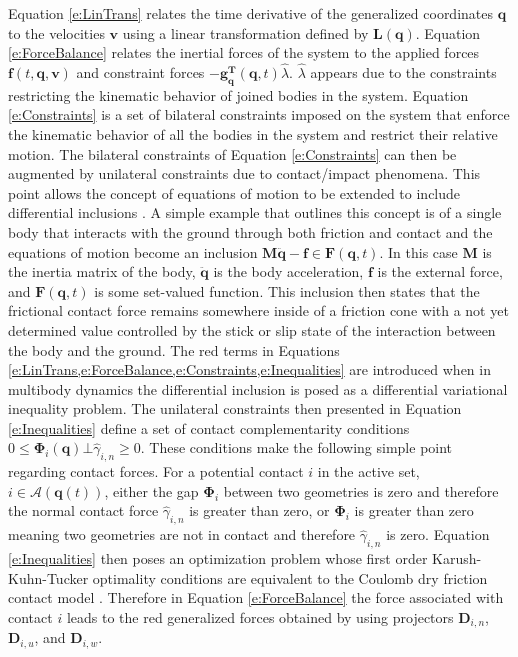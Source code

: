 \documentclass[12pt,onecolumn]{report}
\begin{document}
Equation \eqref{e:LinTrans} relates the time derivative of the generalized coordinates $\boldsymbol{q}$ to the velocities $\boldsymbol{v}$ using a linear transformation defined by $\boldsymbol{L}\left(\boldsymbol{q}\right)$. Equation \eqref{e:ForceBalance} relates the inertial forces of the system to the applied forces $\boldsymbol{f}\left(t,\boldsymbol{q},\boldsymbol{v}\right)$ and constraint forces $- \boldsymbol{g^T_q} \left(\boldsymbol{q},t\right)\hat{\lambda}$.  $\hat{\lambda}$ appears due to the constraints restricting the kinematic behavior of joined bodies in the system. Equation \eqref{e:Constraints} is a set of bilateral constraints imposed on the system that enforce the kinematic behavior of all the bodies in the system and restrict their relative motion. The bilateral constraints of Equation \eqref{e:Constraints} can then be augmented by unilateral constraints due to contact/impact phenomena. This point allows the concept of equations of motion to be extended to include differential inclusions \cite{filippov88}. A simple example that outlines this concept is of a single body that interacts with the ground through both friction and contact and the equations of motion become an inclusion $\boldsymbol{M\ddot{q}}-\boldsymbol{f}\in\boldsymbol{F}\left(\boldsymbol{q},t\right)$. In this case $\boldsymbol{M}$ is the inertia matrix of the body,  $\boldsymbol{\ddot{q}}$ is the body acceleration,  $\boldsymbol{f}$ is the external force, and $\boldsymbol{F}\left(\boldsymbol{q},t\right)$ is some set-valued function. This inclusion then states that the frictional contact force remains somewhere inside of a friction cone with a not yet determined value controlled by the stick or slip state of the interaction between the body and the ground. The red terms in Equations \cref{e:LinTrans,e:ForceBalance,e:Constraints,e:Inequalities} are introduced when in multibody dynamics the differential inclusion is posed as a differential variational inequality problem. The unilateral constraints then presented in Equation \eqref{e:Inequalities} define a set of contact complementarity conditions $0\le\boldsymbol{\Phi}_i \left(\boldsymbol{q}\right) \bot \hat\gamma_{i,n}  \ge 0$. These conditions make the following simple point regarding contact forces. For a potential contact $i$ in the active set, $i \in \mathcal{A}\left(\boldsymbol{q}\left(t\right)\right)$, either the gap $\boldsymbol{\Phi}_i$ between two geometries is zero and therefore the normal contact force $\hat\gamma_{i,n}$ is greater than zero, or $\boldsymbol{\Phi}_i$ is greater than zero meaning two geometries are not in contact and therefore $\hat\gamma_{i,n}$ is zero. Equation \eqref{e:Inequalities} then poses an optimization problem whose first order Karush-Kuhn-Tucker optimality conditions are equivalent to the Coulomb dry friction contact model \cite{st00}. Therefore in Equation \eqref{e:ForceBalance} the force associated with contact $i$ leads to the red generalized forces obtained by using projectors $\boldsymbol{D}_{i,n}$, $\boldsymbol{D}_{i,u}$, and $\boldsymbol{D}_{i,w}$.
\end{document}
